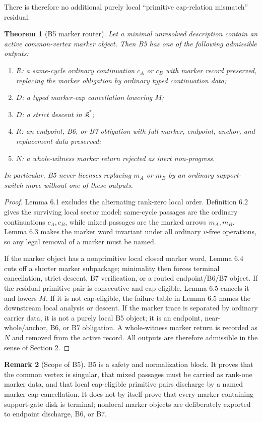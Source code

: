 \documentclass[11pt]{amsart}
\newtheorem{theorem}{Theorem}[section]
\theoremstyle{definition}
\newtheorem{remark}[theorem]{Remark}
\begin{document}
There is therefore no additional purely local ``primitive cap-relation mismatch'' residual.

\begin{theorem}[B5 marker router]
Let a minimal unresolved description contain an active common-vertex marker object. Then B5 has one of the following admissible outputs:

\begin{enumerate}
\item \(R\): a same-cycle ordinary continuation \(c_A\) or \(c_B\) with marker record preserved, replacing the marker obligation by ordinary typed continuation data;
\item \(D\): a typed marker-cap cancellation lowering \(M\);
\item \(D\): a strict descent in \(\mathfrak K^\ast\);
\item \(R\): an endpoint, B6, or B7 obligation with full marker, endpoint, anchor, and replacement data preserved;
\item \(N\): a whole-witness marker return rejected as inert non-progress.
\end{enumerate}

In particular, B5 never licenses replacing \(m_A\) or \(m_B\) by an ordinary support-switch move without one of these outputs.

\end{theorem}
\begin{proof}
Lemma 6.1 excludes the alternating rank-zero local order. Definition 6.2 gives the surviving local sector model: same-cycle passages are the ordinary continuations \(c_A,c_B\), while mixed passages are the marked arrows \(m_A,m_B\). Lemma 6.3 makes the marker word invariant under all ordinary \(v\)-free operations, so any legal removal of a marker must be named.

If the marker object has a nonprimitive local closed marker word, Lemma 6.4
cuts off a shorter marker subpackage; minimality then forces terminal
cancellation, strict descent, B7 verification, or a routed endpoint/B6/B7
object. If the residual primitive pair is consecutive and cap-eligible, Lemma
6.5 cancels it and lowers \(M\). If it is not cap-eligible, the failure table in
Lemma 6.5 names the downstream local analysis or descent. If the marker trace
is separated by ordinary carrier data, it is not a purely local B5 object; it is
an endpoint, near-whole/anchor, B6, or B7 obligation. A whole-witness marker
return is recorded as \(N\) and removed from the active record. All outputs are
therefore admissible in the sense of Section 2.

\end{proof}
\begin{remark}[Scope of B5]
B5 is a safety and normalization block. It proves that the common vertex is singular, that mixed passages must be carried as rank-one marker data, and that local cap-eligible primitive pairs discharge by a named marker-cap cancellation. It does not by itself prove that every marker-containing support-gate disk is terminal; nonlocal marker objects are deliberately exported to endpoint discharge, B6, or B7.

\end{remark}
\end{document}
